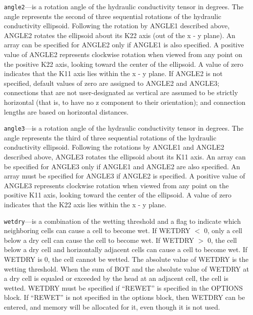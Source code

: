 \begin{description}
\item \texttt{angle2}---is a rotation angle of the hydraulic conductivity tensor in degrees. The angle represents the second of three sequential rotations of the hydraulic conductivity ellipsoid. Following the rotation by ANGLE1 described above, ANGLE2 rotates the ellipsoid about its K22 axis (out of the x - y plane). An array can be specified for ANGLE2 only if ANGLE1 is also specified. A positive value of ANGLE2 represents clockwise rotation when viewed from any point on the positive K22 axis, looking toward the center of the ellipsoid. A value of zero indicates that the K11 axis lies within the x - y plane. If ANGLE2 is not specified, default values of zero are assigned to ANGLE2 and ANGLE3; connections that are not user-designated as vertical are assumed to be strictly horizontal (that is, to have no z component to their orientation); and connection lengths are based on horizontal distances.

\item \texttt{angle3}---is a rotation angle of the hydraulic conductivity tensor in degrees. The angle represents the third of three sequential rotations of the hydraulic conductivity ellipsoid. Following the rotations by ANGLE1 and ANGLE2 described above, ANGLE3 rotates the ellipsoid about its K11 axis. An array can be specified for ANGLE3 only if ANGLE1 and ANGLE2 are also specified. An array must be specified for ANGLE3 if ANGLE2 is specified. A positive value of ANGLE3 represents clockwise rotation when viewed from any point on the positive K11 axis, looking toward the center of the ellipsoid. A value of zero indicates that the K22 axis lies within the x - y plane.

\item \texttt{wetdry}---is a combination of the wetting threshold and a flag to indicate which neighboring cells can cause a cell to become wet. If WETDRY $<$ 0, only a cell below a dry cell can cause the cell to become wet. If WETDRY $>$ 0, the cell below a dry cell and horizontally adjacent cells can cause a cell to become wet. If WETDRY is 0, the cell cannot be wetted. The absolute value of WETDRY is the wetting threshold. When the sum of BOT and the absolute value of WETDRY at a dry cell is equaled or exceeded by the head at an adjacent cell, the cell is wetted.  WETDRY must be specified if ``REWET'' is specified in the OPTIONS block.  If ``REWET'' is not specified in the options block, then WETDRY can be entered, and memory will be allocated for it, even though it is not used.

\end{description}

